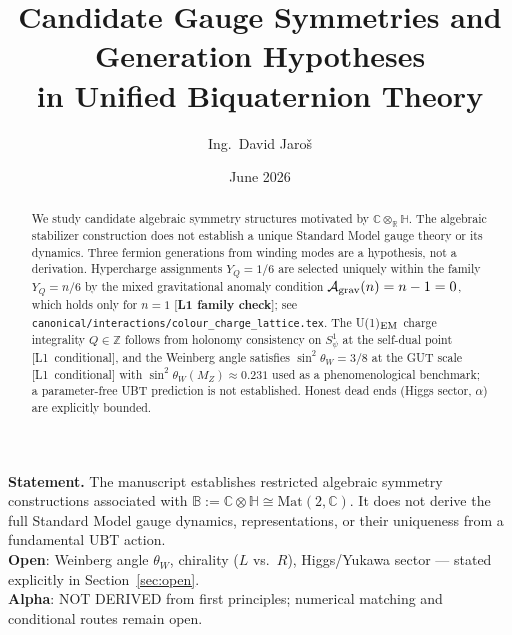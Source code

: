 \documentclass[12pt,a4paper]{article}
\title{\textbf{Candidate Gauge Symmetries and Generation Hypotheses\\
               in Unified Biquaternion Theory}}
\author{Ing.\ David Jaroš}
\date{June 2026}
\theoremstyle{definition}
\theoremstyle{remark}
\newcommand{\Bq}{\mathbb{C}\otimes\mathbb{H}}
\begin{document}
\maketitle


\begin{tcolorbox}[enhanced,colback=blue!4!white,colframe=blue!55!black,
  arc=3pt,boxrule=1.2pt,
  title={\textbf{\large Main Theorem (Gauge Structure)}}]
\textbf{Statement.}
The manuscript establishes restricted algebraic symmetry constructions associated with
$\mathbb{B}:=\Bq\cong\mathrm{Mat}(2,\mathbb{C})$.
It does not derive the full Standard Model gauge dynamics, representations,
or their uniqueness from a fundamental UBT action.\\[4pt]
\textbf{Open}: Weinberg angle $\theta_W$, chirality ($L$ vs.\ $R$), Higgs/Yukawa sector —
stated explicitly in Section~\ref{sec:open}.\\[4pt]
\textbf{Alpha}: NOT DERIVED from first principles; numerical matching and conditional routes remain open.
\end{tcolorbox}

\begin{abstract}
We study candidate algebraic symmetry structures motivated by
$\mathbb{C}\otimes_{\mathbb{R}}\mathbb{H}$. The algebraic stabilizer construction
does not establish a unique Standard Model gauge theory or its dynamics.
Three fermion generations from winding modes are a hypothesis, not a derivation.
Hypercharge assignments $Y_Q=1/6$ are selected uniquely within the
family $Y_Q = n/6$ by the mixed gravitational anomaly condition
$\mathcal{A}_{\rm grav}(n) = n-1 = 0$, which holds only for $n=1$
[\textbf{L1 family check}]; see
\texttt{canonical/interactions/colour\_charge\_lattice.tex}.
The U(1)$_{\rm EM}$ charge integrality $Q\in\mathbb{Z}$ follows
from holonomy consistency on $S^1_\psi$ at the self-dual point
[L1~conditional], and the Weinberg angle satisfies
$\sin^2\theta_W = 3/8$ at the GUT scale [L1~conditional] with
$\sin^2\theta_W(M_Z)\approx 0.231$ used as a phenomenological benchmark;
a parameter-free UBT prediction is not established.
Honest dead ends (Higgs sector, $\alpha$) are
explicitly bounded.
\end{abstract}

\tableofcontents

\end{document}
